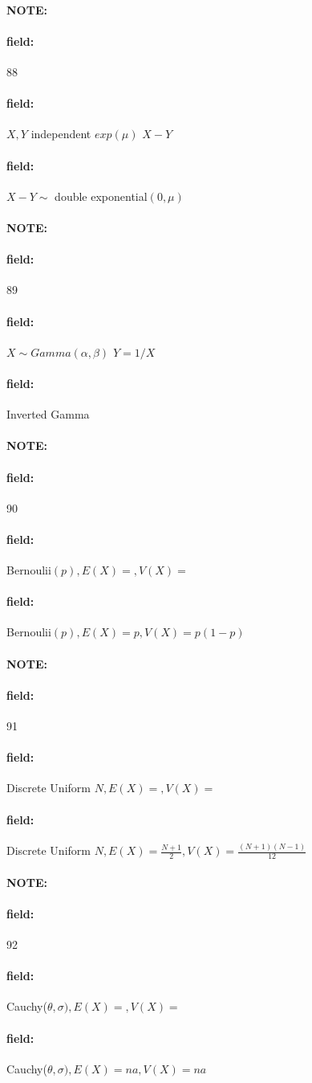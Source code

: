 \documentclass[12pt]{article}
\newenvironment{note}{\paragraph{NOTE:}}{}
\newenvironment{field}{\paragraph{field:}}{}
\begin{document}
\begin{note} \begin{field} \tiny 88 \end{field}
  \begin{field}
    $X,Y $ independent $exp(\mu)$ $X-Y$
  \end{field}
  \begin{field}
    $X-Y \sim $ double exponential$(0,\mu)$
  \end{field}
\end{note}


\begin{note} \begin{field} \tiny 89 \end{field}
  \begin{field}

    $X \sim Gamma(\alpha,\beta)$ $Y = 1/X$
  \end{field}
  \begin{field}
      Inverted Gamma
  \end{field}
\end{note}

\begin{note} \begin{field} \tiny 90 \end{field}
  \begin{field}
    Bernoulii$(p), E(X) = , V(X) = $
  \end{field}
  \begin{field}
     Bernoulii$(p), E(X) = p, V(X) = p(1-p)$
  \end{field}
\end{note}

\begin{note} \begin{field} \tiny 91 \end{field}
  \begin{field}
    Discrete Uniform $N, E(X) = , V(X) = $
  \end{field}
  \begin{field}
    Discrete Uniform $N, E(X) = \frac{N+1}{2}, V(X) = \frac{(N+1)(N-1)}{12}$
  \end{field}
\end{note}

\begin{note} \begin{field} \tiny 92 \end{field}
  \begin{field}
    Cauchy($\theta,\sigma), E(X) = ,V(X)=$
  \end{field}
  \begin{field}
    Cauchy($\theta,\sigma), E(X) = na,V(X)=na$
  \end{field}
\end{note}
\end{document}
